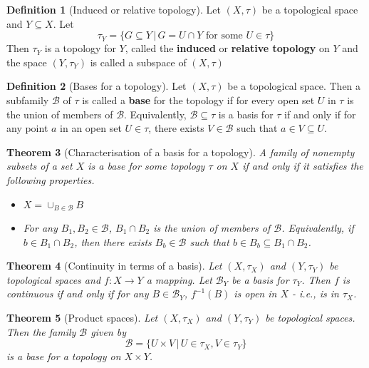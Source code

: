 \documentclass[10pt, oneside, reqno]{amsart}
\theoremstyle{plain}%
\newtheorem{thm}{Theorem}[section]
\theoremstyle{definition}
\newtheorem{defn}[thm]{Definition}
\theoremstyle{remark}
\newcommand{\topo}{(X,\tau)}
\begin{document}
\begin{defn}[Induced or relative topology]
		Let $\topo$ be a topological space and $Y \subseteq X$. Let \[
			\tau_Y = \{ G \subseteq Y \, | \, G = U \cap Y \text{ for some $U \in \tau$} \}
		\]
	Then $\tau_Y$ is a topology for $Y$, called the \textbf{induced} or \textbf{relative topology} on $Y$ and the space $(Y, \tau_Y)$ is called a subspace of $\topo$
\end{defn}

\begin{defn}[Bases for a topology]
	Let $\topo$ be a topological space.  Then a subfamily $\mathcal{B}$ of $\tau$ is called a \textbf{base} for the topology if for every open set $U$ in $\tau$ is the union of members of $\mathcal{B}$.  Equivalently, $\mathcal{B} \subseteq \tau$ is a basis for $\tau$ if and only if for any point $a$ in an open set $U \in \tau$, there exists $V \in \mathcal{B}$ such that $a \in V \subseteq U$.
\end{defn}

\begin{thm}[Characterisation of a basis for a topology]
	A family of nonempty subsets of a set $X$ is a base for some topology $\tau$ on $X$ if and only if it satisfies the following properties.
	\begin{itemize}
		\item $X = \cup_{B \in \mathcal{B}} B$
		\item For any $B_1, B_2 \in \mathcal{B}$, $B_1 \cap B_2$ is the union of members of $\mathcal{B}$.  Equivalently, if $b \in B_1 \cap B_2$, then there exists $B_b \in \mathcal{B}$ such that $b \in B_b \subseteq B_1 \cap B_2$.
	\end{itemize}
\end{thm}

\begin{thm}[Continuity in terms of a basis]
	Let $(X, \tau_X)$ and $(Y, \tau_Y)$ be topological spaces and $f : X \rightarrow Y$ a mapping.  Let $\mathcal{B}_Y$ be a basis for $\tau_Y$.  Then $f$ is continuous if and only if for any $B \in \mathcal{B}_Y$, $f^{-1}(B)$ is open in $X$ - i.e., is in $\tau_X$.
\end{thm}


\begin{thm}[Product spaces]
	Let $(X, \tau_X)$ and $(Y, \tau_Y)$ be topological spaces.  Then the family $\mathcal{B}$ given by \[
		\mathcal{B} = \{ U \times V \, | \, U \in \tau_X, V \in \tau_Y \}
	\]
	is a base for a topology on $X \times Y$.
\end{thm}
\end{document}
